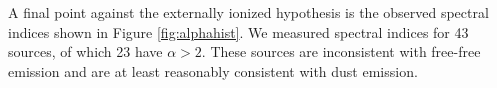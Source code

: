 \documentclass[twocolumn]{aastex61}
\begin{document}
A final point against the externally ionized hypothesis is the observed
spectral indices shown in Figure \ref{fig:alphahist}.  We measured spectral
indices for 43 sources, of which 23 have $\alpha>2$.  These sources are
inconsistent with free-free emission and are at least reasonably consistent
with dust emission.



% 
% 


%
\end{document}
